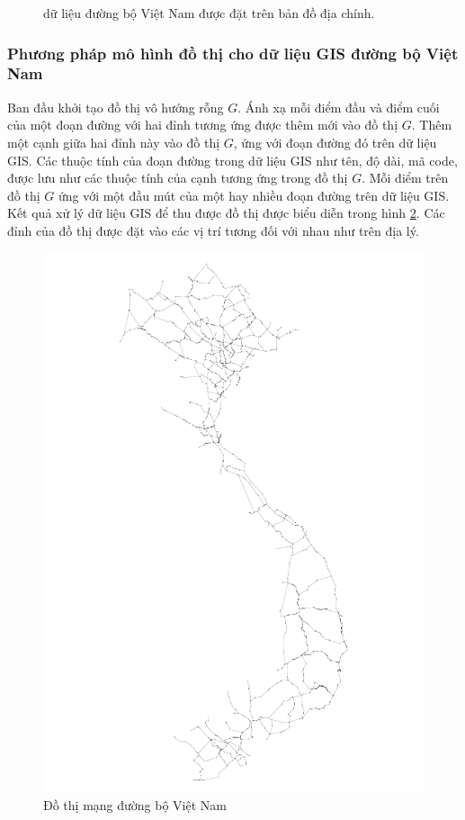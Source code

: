 \documentclass[14pt, oneside, a4paper, openany]{scrartcl}
\begin{document}
\begin{figure}
\begin{minipage}{0.6\textwidth}
		\caption[dữ liệu đường bộ Việt Nam được đặt trên bản đồ địa chính]{dữ liệu đường bộ Việt Nam được đặt trên bản đồ địa chính.}
		\label{fig:vnhighway02}
	\end{minipage}
\end{figure}

\subsubsection{Phương pháp mô hình đồ thị cho dữ liệu GIS đường bộ Việt Nam}
Ban đầu khởi tạo đồ thị vô hướng rỗng $G$. Ánh xạ mỗi điểm đầu và điểm cuối của một đoạn đường với hai đỉnh tương ứng được thêm mới vào đồ thị $G$. Thêm một cạnh giữa hai đỉnh này vào đồ thị $G$, ứng với đoạn đường đó trên dữ liệu GIS. Các thuộc tính của đoạn đường trong dữ liệu GIS như tên, độ dài, mã code, được lưu như các thuộc tính của cạnh tương ứng trong đồ thị $G$.
Mỗi điểm trên đồ thị $G$ ứng với một đầu mút của một hay nhiều đoạn đường trên dữ liệu GIS.
Kết quả xử lý dữ liệu GIS để thu được đồ thị được biểu diễn trong hình \ref{fig:vnhighwaynet}. Các đỉnh của đồ thị được đặt vào các vị trí tương đối với nhau như trên địa lý.

\begin{figure}[!h]
	\centering
	\includegraphics[scale=0.5]{figures/vietnamroad.pdf} 
	\caption[Đồ thị mạng đường bộ Việt Nam]{Đồ thị mạng đường bộ Việt Nam}
	\label{fig:vnhighwaynet}
\end{figure}
\end{document}

